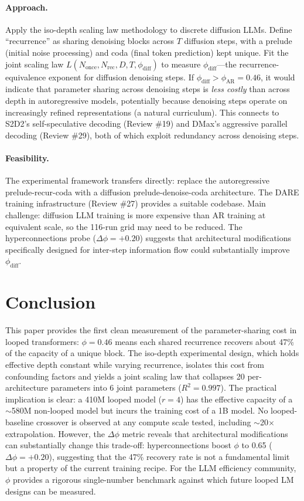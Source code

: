 \documentclass[11pt]{article}
\begin{document}
\paragraph{Approach.}
Apply the iso-depth scaling law methodology to discrete diffusion LLMs. Define ``recurrence'' as sharing denoising blocks across $T$ diffusion steps, with a prelude (initial noise processing) and coda (final token prediction) kept unique. Fit the joint scaling law $L(N_{\mathrm{once}}, N_{\mathrm{rec}}, D, T, \phi_{\mathrm{diff}})$ to measure $\phi_{\mathrm{diff}}$---the recurrence-equivalence exponent for diffusion denoising steps. If $\phi_{\mathrm{diff}} > \phi_{\mathrm{AR}} = 0.46$, it would indicate that parameter sharing across denoising steps is \emph{less costly} than across depth in autoregressive models, potentially because denoising steps operate on increasingly refined representations (a natural curriculum). This connects to S2D2's self-speculative decoding (Review \#19) and DMax's aggressive parallel decoding (Review \#29), both of which exploit redundancy across denoising steps.

\paragraph{Feasibility.}
The experimental framework transfers directly: replace the autoregressive prelude-recur-coda with a diffusion prelude-denoise-coda architecture. The DARE training infrastructure (Review \#27) provides a suitable codebase. Main challenge: diffusion LLM training is more expensive than AR training at equivalent scale, so the 116-run grid may need to be reduced. The hyperconnections probe ($\Delta\phi = +0.20$) suggests that architectural modifications specifically designed for inter-step information flow could substantially improve $\phi_{\mathrm{diff}}$.

\section{Conclusion}

This paper provides the first clean measurement of the parameter-sharing cost in looped transformers: $\phi = 0.46$ means each shared recurrence recovers about 47\% of the capacity of a unique block. The iso-depth experimental design, which holds effective depth constant while varying recurrence, isolates this cost from confounding factors and yields a joint scaling law that collapses 20 per-architecture parameters into 6 joint parameters ($R^2 = 0.997$). The practical implication is clear: a 410M looped model ($r{=}4$) has the effective capacity of a $\sim$580M non-looped model but incurs the training cost of a 1B model. No looped-baseline crossover is observed at any compute scale tested, including $\sim$20$\times$ extrapolation. However, the $\Delta\phi$ metric reveals that architectural modifications can substantially change this trade-off: hyperconnections boost $\phi$ to 0.65 ($\Delta\phi = +0.20$), suggesting that the 47\% recovery rate is not a fundamental limit but a property of the current training recipe. For the LLM efficiency community, $\phi$ provides a rigorous single-number benchmark against which future looped LM designs can be measured.
\end{document}

